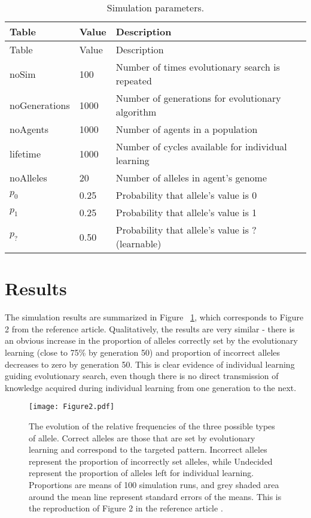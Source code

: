 \documentclass[10pt,a4paper,onecolumn]{article}
\renewcommand{\includegraphics}[2][]{\OldIncludegraphics[width=12cm, #1]{#2}}
\begin{document}
\hypertarget{tbl:parameters}{}
\begin{longtable}[]{@{}lll@{}}
\caption{\label{tbl:parameters}Simulation parameters. }\tabularnewline
\toprule
Table & Value & Description\tabularnewline
\midrule
\endfirsthead
\toprule
Table & Value & Description\tabularnewline
\midrule
\endhead
noSim & 100 & Number of times evolutionary search is
repeated\tabularnewline
noGenerations & 1000 & Number of generations for evolutionary
algorithm\tabularnewline
noAgents & 1000 & Number of agents in a population\tabularnewline
lifetime & 1000 & Number of cycles available for individual
learning\tabularnewline
noAlleles & 20 & Number of alleles in agent's genome\tabularnewline
\(p_0\) & 0.25 & Probability that allele's value is 0\tabularnewline
\(p_1\) & 0.25 & Probability that allele's value is 1\tabularnewline
\(p_?\) & 0.50 & Probability that allele's value is ?
(learnable)\tabularnewline
\bottomrule
\end{longtable}

\section{Results}\label{results}

The simulation results are summarized in Figure
~\ref{fig:relFrequencies50}, which corresponds to Figure 2 from the
reference article. Qualitatively, the results are very similar - there
is an obvious increase in the proportion of alleles correctly set by the
evolutionary learning (close to 75\% by generation 50) and proportion of
incorrect alleles decreases to zero by generation 50. This is clear
evidence of individual learning guiding evolutionary search, even though
there is no direct transmission of knowledge acquired during individual
learning from one generation to the next.

\begin{figure}
\centering
\texttt{[image: Figure2.pdf]}
\caption{The evolution of the relative frequencies of the three possible
types of allele. Correct alleles are those that are set by evolutionary
learning and correspond to the targeted pattern. Incorrect alleles
represent the proportion of incorrectly set alleles, while Undecided
represent the proportion of alleles left for individual learning.
Proportions are means of 100 simulation runs, and grey shaded area
around the mean line represent standard errors of the means. This is the
reproduction of Figure 2 in the reference article
\autocite{hinton1987learning}.}\label{fig:relFrequencies50}
\end{figure}
\end{document}

